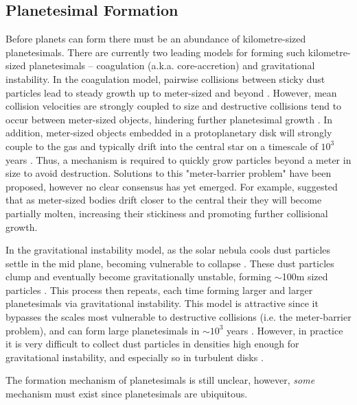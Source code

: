 \subsection{Planetesimal Formation}
Before planets can form there must be an abundance of kilometre-sized planetesimals.
There are currently two leading models for forming such kilometre-sized planetesimals -- coagulation (a.k.a. core-accretion) and gravitational instability. 
In the coagulation model, pairwise collisions between sticky dust particles lead to steady growth up to meter-sized and beyond \citep{Weidenschilling1977b, Armitage2010}.
However, mean collision velocities are strongly coupled to size and destructive collisions tend to occur between meter-sized objects, hindering further planetesimal growth \citep{Weidenschilling1977b, Blum2008}. 
In addition, meter-sized objects embedded in a protoplanetary disk will strongly couple to the gas and typically drift into the central star on a timescale of $10^3$ years \citep{Weidenschilling1977b}.
Thus, a mechanism is required to quickly grow particles beyond a meter in size to avoid destruction. 
Solutions to this "meter-barrier problem" have been proposed, however no clear consensus has yet emerged.  
For example, \citet[e.g.][]{Boley2014} suggested that as meter-sized bodies drift closer to the central their they will become partially molten, increasing their stickiness and promoting further collisional growth. 

In the gravitational instability model, as the solar nebula cools dust particles settle in the mid plane, becoming vulnerable to collapse \citep{Goldreich1973}.
These dust particles clump and eventually become gravitationally unstable, forming $\sim$100m sized particles \citep{Goldreich1973}. 
This process then repeats, each time forming larger and larger planetesimals via gravitational instability.
This model is attractive since it bypasses the scales most vulnerable to destructive collisions (i.e. the meter-barrier problem), and can form large planetesimals in $\sim 10^3$ years \citep{Goldreich1973, Armitage2007}.
However, in practice it is very difficult to collect dust particles in densities high enough for gravitational instability, and especially so in turbulent disks \citep{Armitage2007}.
 
The formation mechanism of planetesimals is still unclear, however, \textit{some} mechanism must exist since planetesimals are ubiquitous. 

